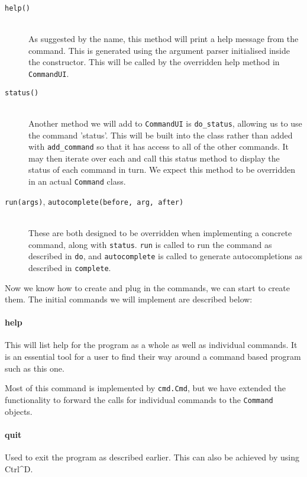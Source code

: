 \documentclass{report}
\begin{document}
\begin{description}
\item[\texttt{help()}] \hfill \\
As suggested by the name, this method will print a help message from the command. This is generated using the argument parser initialised inside
the constructor. This will be called by the overridden help method in \texttt{CommandUI}.

\item[\texttt{status()}] \hfill \\
Another method we will add to \texttt{CommandUI} is \texttt{do\_status}, allowing us to use the command 'status'. This will be built into the
class rather than added with \texttt{add\_command} so that it has access to all of the other commands. It may then iterate over each and call
this status method to display the status of each command in turn. We expect this method to be overridden in an actual \texttt{Command} class.

\item[\texttt{run(args)}, \texttt{autocomplete(before, arg, after)}] \hfill \\
These are both designed to be overridden when implementing a concrete command, along with \texttt{status}. \texttt{run} is called to run the
command as described in \texttt{do}, and \texttt{autocomplete} is called to generate autocompletions as described in \texttt{complete}.
\end{description}

Now we know how to create and plug in the commands, we can start to create them. The initial commands we will implement are described below:

\paragraph{help}

This will list help for the program as a whole as well as individual commands. It is an essential tool for a user to find their way around a
command based program such as this one.

Most of this command is implemented by \texttt{cmd.Cmd}, but we have extended the functionality to forward the calls for individual commands
to the \texttt{Command} objects.

\paragraph{quit}

Used to exit the program as described earlier. This can also be achieved by using Ctrl\^{}D.
\end{document}

